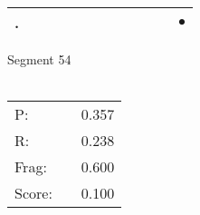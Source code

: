 \documentclass[landscape]{article}
\newcommand{\ssp}{\hspace{2pt}}
\newcommand{\mex}{\cellcolor{g}$\bullet$}
\begin{document}
\begin{tabular}{|l|p{10pt}|p{10pt}|p{10pt}|p{10pt}|p{10pt}|p{10pt}|p{10pt}|p{10pt}|p{10pt}|p{10pt}|p{10pt}|}
\hline
\ssp \cellcolor{ref10}. \ssp&\hspace{2pt}&\hspace{2pt}&\hspace{2pt}&\hspace{2pt}&\hspace{2pt}&\hspace{2pt}&\hspace{2pt}&\hspace{2pt}&\hspace{2pt}&\hspace{2pt}&\hspace{2pt}\mex\\
\hline
\end{tabular}

\vspace{6pt}
\noindent Segment 54\\\\
\noindent\begin{tabular}{lm{12pt}r}
\hline
P:&&0.357\\
R:&&0.238\\
Frag:&&0.600\\
Score:&&0.100\\
\end{tabular}

\newpage
\end{document}
